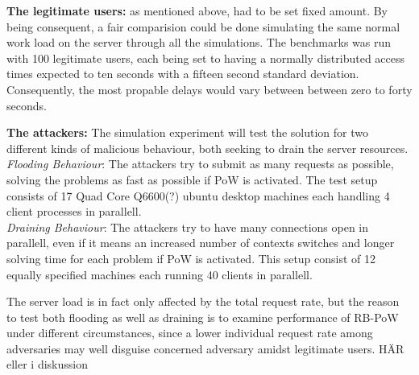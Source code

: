 \textbf{The legitimate users:} as mentioned above, had to be set fixed amount. By being consequent, a fair comparision could be done simulating the same normal work load on the server through all the simulations. The benchmarks was run with 100 legitimate users, each being set to having a normally distributed access times expected to ten seconds with a fifteen second standard deviation. Consequently, the most propable delays would vary between between zero to forty seconds.

\textbf{The attackers:} The simulation experiment will test the solution for two different kinds of malicious behaviour, both seeking to drain the server resources.\\
\emph{Flooding Behaviour}: The attackers try to submit as many requests as possible, solving the problems as fast as possible if PoW is activated. The test setup consists of 17 Quad Core Q6600(?) ubuntu desktop machines each handling 4 client processes in parallell.\\
\emph{Draining Behaviour}: The attackers try to have many connections open in parallell, even if it means an increased number of contexts switches and longer solving time for each problem if PoW is activated. This setup consist of 12 equally specified machines each running 40 clients in parallell.

The server load is in fact only affected by the total request rate, but the reason to test both flooding as well as draining is to examine performance of RB-PoW under different circumstances, since a lower individual request rate among adversaries may well disguise concerned adversary amidst legitimate users. {\color{red} HÄR eller i diskussion}


